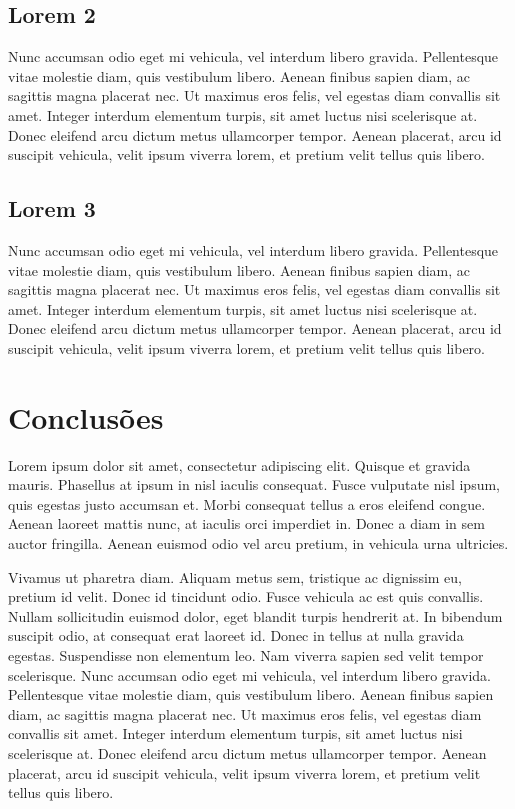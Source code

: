 \documentclass[a4paper, 12pt, openright, oneside]{article}
\begin{document}
\subsection{Lorem 2}
Nunc accumsan odio eget mi vehicula, vel interdum libero gravida. Pellentesque vitae molestie diam, quis vestibulum libero. Aenean finibus sapien diam, ac sagittis magna placerat nec. Ut maximus eros felis, vel egestas diam convallis sit amet. Integer interdum elementum turpis, sit amet luctus nisi scelerisque at. Donec eleifend arcu dictum metus ullamcorper tempor. Aenean placerat, arcu id suscipit vehicula, velit ipsum viverra lorem, et pretium velit tellus quis libero.

\subsection{Lorem 3}
Nunc accumsan odio eget mi vehicula, vel interdum libero gravida. Pellentesque vitae molestie diam, quis vestibulum libero. Aenean finibus sapien diam, ac sagittis magna placerat nec. Ut maximus eros felis, vel egestas diam convallis sit amet. Integer interdum elementum turpis, sit amet luctus nisi scelerisque at. Donec eleifend arcu dictum metus ullamcorper tempor. Aenean placerat, arcu id suscipit vehicula, velit ipsum viverra lorem, et pretium velit tellus quis libero.

\newpage

\section{Conclusões}

Lorem ipsum dolor sit amet, consectetur adipiscing elit. Quisque et gravida mauris. Phasellus at ipsum in nisl iaculis consequat. Fusce vulputate nisl ipsum, quis egestas justo accumsan et. Morbi consequat tellus a eros eleifend congue. Aenean laoreet mattis nunc, at iaculis orci imperdiet in. Donec a diam in sem auctor fringilla. Aenean euismod odio vel arcu pretium, in vehicula urna ultricies.

Vivamus ut pharetra diam. Aliquam metus sem, tristique ac dignissim eu, pretium id velit. Donec id tincidunt odio. Fusce vehicula ac est quis convallis. Nullam sollicitudin euismod dolor, eget blandit turpis hendrerit at. In bibendum suscipit odio, at consequat erat laoreet id. Donec in tellus at nulla gravida egestas. Suspendisse non elementum leo. Nam viverra sapien sed velit tempor scelerisque. Nunc accumsan odio eget mi vehicula, vel interdum libero gravida. Pellentesque vitae molestie diam, quis vestibulum libero. Aenean finibus sapien diam, ac sagittis magna placerat nec. Ut maximus eros felis, vel egestas diam convallis sit amet. Integer interdum elementum turpis, sit amet luctus nisi scelerisque at. Donec eleifend arcu dictum metus ullamcorper tempor. Aenean placerat, arcu id suscipit vehicula, velit ipsum viverra lorem, et pretium velit tellus quis libero.
\end{document}
